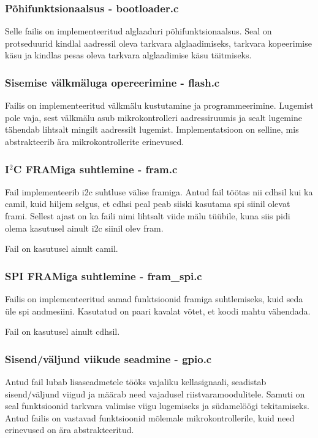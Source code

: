\documentclass[12pt,a4paper]{article}
\newcommand{\iic}{I${}^2$C}
\begin{document}
\subsubsection{Põhifunktsionaalsus - \textbf{bootloader.c}}
Selle failis on implementeeritud alglaaduri põhifunktsionaalsus. Seal on
protseduurid kindlal aadressil oleva tarkvara alglaadimiseks, tarkvara
kopeerimise käsu ja kindlas pesas oleva tarkvara alglaadimise käsu täitmiseks.

\subsubsection{Sisemise välkmäluga opereerimine - \textbf{flash.c}}
Failis on implementeeritud välkmälu kustutamine ja programmeerimine.
Lugemist pole vaja, sest välkmälu asub mikrokontrolleri aadressiruumis ja sealt
lugemine tähendab lihtsalt mingilt aadressilt lugemist. Implementatsioon on
selline, mis abstrakteerib ära mikrokontrollerite erinevused.

\subsubsection{\texorpdfstring{\iic}{I2C} FRAMiga suhtlemine - \textbf{fram.c}}
Fail implementeerib \gls{i2c} suhtluse välise \gls{fram}iga. Antud fail töötas nii \gls{cdhs}il
kui ka \gls{cam}il, kuid hiljem selgus, et \gls{cdhs}i peal peab siiski kasutama \gls{spi} siinil
olevat \gls{fram}i. Sellest ajast on ka faili nimi lihtsalt viide mälu tüübile, kuna
siis pidi olema kasutusel ainult \gls{i2c} siinil olev \gls{fram}.

Fail on kasutusel ainult \gls{cam}il.

\subsubsection{SPI FRAMiga suhtlemine - \textbf{fram\_spi.c}}
Failis on implementeeritud samad funktsioonid \gls{fram}iga suhtlemiseks, kuid seda
üle \gls{spi} andmesiini. Kasutatud on paari kavalat võtet, et koodi mahtu vähendada.

Fail on kasutusel ainult \gls{cdhs}il.

\subsubsection{Sisend/väljund viikude seadmine - \textbf{gpio.c}}
Antud fail lubab lisaseadmetele tööks vajaliku kellasignaali, seadistab
sisend/väljund viigud ja määrab need vajadusel riistvaramoodulitele. Samuti on
seal funktsioonid tarkvara valimise viigu lugemiseks ja südamelöögi
tekitamiseks. Antud failis on vastavad funktsioonid mõlemale mikrokontrollerile,
kuid need erinevused on ära abstrakteeritud.
\end{document}
